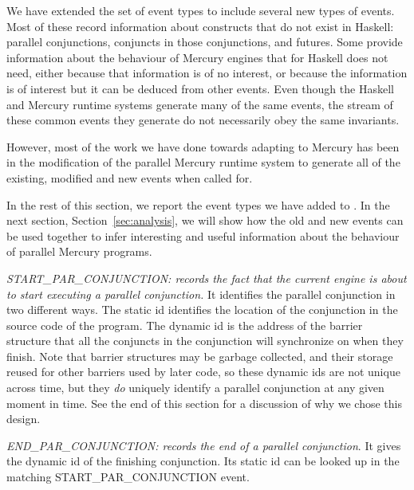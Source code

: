
We have extended the set of \tscope event types
to include several new types of events.
Most of these record information about constructs that do not exist in Haskell:
parallel conjunctions, conjuncts in those conjunctions, and futures.
Some provide information about the behaviour of Mercury engines
that \tscope for Haskell does not need,
either because that information is of no interest,
or because the information is of interest
but it can be deduced from other events.
Even though the Haskell and Mercury runtime systems
generate many of the same events,
the stream of these common events they generate
do not necessarily obey the same invariants.

However, most of the work we have done towards adapting \tscope to Mercury
has been in the modification of the parallel Mercury runtime system
to generate all of the existing, modified and new events when called for.

In the rest of this section,
we report the event types we have added to \tscope.
In the next section, Section~\ref{sec:analysis},
we will show how the old and new events can be used together
to infer interesting and useful information
about the behaviour of parallel Mercury programs.


\emph{START\_PAR\_CONJUNCTION: records the fact that
the current engine is about to start executing a parallel conjunction.}
It identifies the parallel conjunction in two different ways.
The static id identifies
the location of the conjunction in the source code of the program.
The dynamic id is the address of the barrier structure
that all the conjuncts in the conjunction will synchronize on when they finish.
Note that barrier structures may be garbage collected,
and their storage reused for other barriers used by later code,
so these dynamic ids are not unique across time,
but they \emph{do} uniquely identify a parallel conjunction
at any given moment in time.
See the end of this section for a discussion of why we chose this design.

\emph{END\_PAR\_CONJUNCTION:
records the end of a parallel conjunction}.
It gives the dynamic id of the finishing conjunction.
Its static id can be looked up in the matching START\_PAR\_CONJUNCTION event.

